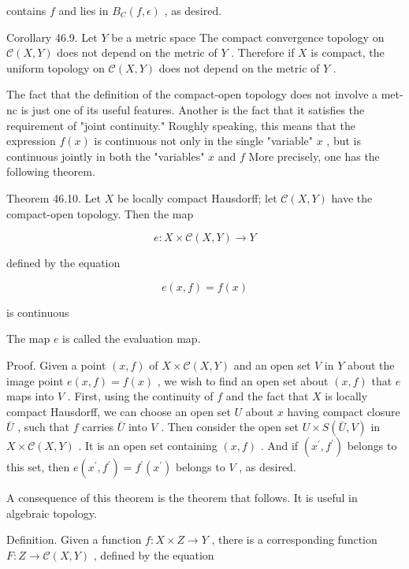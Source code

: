 \documentclass[10pt]{article}
\begin{document}
contains \(f\) and lies in \({B}_{C}\left( {f,\epsilon }\right)\) , as desired.

Corollary 46.9. Let \(Y\) be a metric space The compact convergence topology on \(\mathcal{C}\left( {X,Y}\right)\) does not depend on the metric of \(Y\) . Therefore if \(X\) is compact, the uniform topology on \(\mathcal{C}\left( {X,Y}\right)\) does not depend on the metric of \(Y\) .

The fact that the definition of the compact-open topology does not involve a met-nc is just one of its useful features. Another is the fact that it satisfies the requirement of "joint continuity." Roughly speaking, this means that the expression \(f\left( x\right)\) is continuous not only in the single "variable" \(x\) , but is continuous jointly in both the "variables" \(x\) and \(f\) More precisely, one has the following theorem.

Theorem 46.10. Let \(X\) be locally compact Hausdorff; let \(\mathcal{C}\left( {X,Y}\right)\) have the compact-open topology. Then the map

\[
e : X \times  \mathcal{C}\left( {X,Y}\right)  \rightarrow  Y
\]

defined by the equation

\[
e\left( {x,f}\right)  = f\left( x\right)
\]

is continuous

The map \(e\) is called the evaluation map.

Proof. Given a point \(\left( {x,f}\right)\) of \(X \times  \mathcal{C}\left( {X,Y}\right)\) and an open set \(V\) in \(Y\) about the image point \(e\left( {x,f}\right)  = f\left( x\right)\) , we wish to find an open set about \(\left( {x,f}\right)\) that \(e\) maps into \(V\) . First, using the continuity of \(f\) and the fact that \(X\) is locally compact Hausdorff, we can choose an open set \(U\) about \(x\) having compact closure \(\bar{U}\) , such that \(f\) carries \(\bar{U}\) into \(V\) . Then consider the open set \(U \times  S\left( {\bar{U},V}\right)\) in \(X \times  \mathcal{C}\left( {X,Y}\right)\) . It is an open set containing \(\left( {x,f}\right)\) . And if \(\left( {{x}^{\prime },{f}^{\prime }}\right)\) belongs to this set, then \(e\left( {{x}^{\prime },{f}^{\prime }}\right)  = {f}^{\prime }\left( {x}^{\prime }\right)\) belongs to \(V\) , as desired.

A consequence of this theorem is the theorem that follows. It is useful in algebraic topology.

Definition. Given a function \(f : X \times  Z \rightarrow  Y\) , there is a corresponding function \(F : Z \rightarrow  \mathcal{C}\left( {X,Y}\right)\) , defined by the equation
\end{document}
